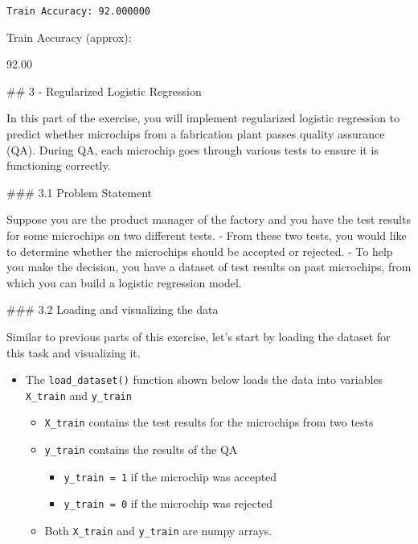 \documentclass[11pt]{article}
\providecommand{\tightlist}{%
      \setlength{\itemsep}{0pt}\setlength{\parskip}{0pt}}
\begin{document}
    \begin{Verbatim}[commandchars=\\\{\}]
Train Accuracy: 92.000000
    \end{Verbatim}

    Train Accuracy (approx):

92.00

    \#\# 3 - Regularized Logistic Regression

In this part of the exercise, you will implement regularized logistic
regression to predict whether microchips from a fabrication plant passes
quality assurance (QA). During QA, each microchip goes through various
tests to ensure it is functioning correctly.

\#\#\# 3.1 Problem Statement

Suppose you are the product manager of the factory and you have the test
results for some microchips on two different tests. - From these two
tests, you would like to determine whether the microchips should be
accepted or rejected. - To help you make the decision, you have a
dataset of test results on past microchips, from which you can build a
logistic regression model.

\#\#\# 3.2 Loading and visualizing the data

Similar to previous parts of this exercise, let's start by loading the
dataset for this task and visualizing it.

\begin{itemize}
\tightlist
\item
  The \texttt{load\_dataset()} function shown below loads the data into
  variables \texttt{X\_train} and \texttt{y\_train}

  \begin{itemize}
  \tightlist
  \item
    \texttt{X\_train} contains the test results for the microchips from
    two tests
  \item
    \texttt{y\_train} contains the results of the QA

    \begin{itemize}
    \tightlist
    \item
      \texttt{y\_train\ =\ 1} if the microchip was accepted
    \item
      \texttt{y\_train\ =\ 0} if the microchip was rejected
    \end{itemize}
  \item
    Both \texttt{X\_train} and \texttt{y\_train} are numpy arrays.
  \end{itemize}
\end{itemize}
\end{document}
